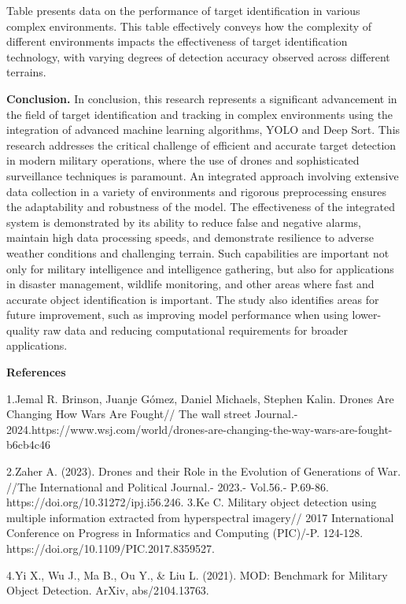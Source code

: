 Table presents data on the performance of target identification in
various complex environments. This table effectively conveys how the
complexity of different environments impacts the effectiveness of target
identification technology, with varying degrees of detection accuracy
observed across different terrains.

\textbf{Conclusion.} In conclusion, this research represents a
significant advancement in the field of target identification and
tracking in complex environments using the integration of advanced
machine learning algorithms, YOLO and Deep Sort. This research addresses
the critical challenge of efficient and accurate target detection in
modern military operations, where the use of drones and sophisticated
surveillance techniques is paramount. An integrated approach involving
extensive data collection in a variety of environments and rigorous
preprocessing ensures the adaptability and robustness of the model. The
effectiveness of the integrated system is demonstrated by its ability to
reduce false and negative alarms, maintain high data processing speeds,
and demonstrate resilience to adverse weather conditions and challenging
terrain. Such capabilities are important not only for military
intelligence and intelligence gathering, but also for applications in
disaster management, wildlife monitoring, and other areas where fast and
accurate object identification is important. The study also identifies
areas for future improvement, such as improving model performance when
using lower-quality raw data and reducing computational requirements for
broader applications.

\textbf{References}

1.Jemal R. Brinson, Juanje Gómez, Daniel Michaels, Stephen Kalin. Drones
Are Changing How Wars Are Fought// The wall street Journal.-
2024.https://www.wsj.com/world/drones-are-changing-the-way-wars-are-fought-b6cb4c46

2.Zaher A. (2023). Drones and their Role in the Evolution of Generations
of War. //The International and Political Journal.- 2023.- Vol.56.-
P.69-86. https://doi.org/10.31272/ipj.i56.246. 3.Ke C. Military object
detection using multiple information extracted from hyperspectral
imagery// 2017 International Conference on Progress in Informatics and
Computing (PIC)/-P. 124-128. https://doi.org/10.1109/PIC.2017.8359527.

4.Yi X., Wu J., Ma B., Ou Y., \& Liu L. (2021). MOD: Benchmark for
Military Object Detection. ArXiv, abs/2104.13763.

